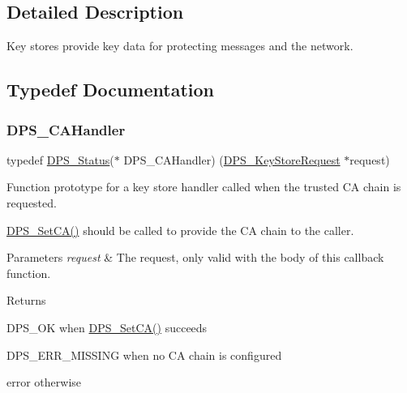 \subsection{Detailed Description}
Key stores provide key data for protecting messages and the network. 



\subsection{Typedef Documentation}
\mbox{\label{group__keystore_ga0acd005f34bca4fcbe1c460e2305ddae}} 
\subsubsection{\texorpdfstring{D\+P\+S\+\_\+\+C\+A\+Handler}{DPS\_CAHandler}}
{\footnotesize\ttfamily typedef \hyperlink{group__status_ga30395a84d3cad9d4ec29848106415038}{D\+P\+S\+\_\+\+Status}($\ast$ D\+P\+S\+\_\+\+C\+A\+Handler) (\hyperlink{group__keystore_ga7c3e50965b65334e9791780fa855ed16}{D\+P\+S\+\_\+\+Key\+Store\+Request} $\ast$request)}



Function prototype for a key store handler called when the trusted CA chain is requested. 

\hyperlink{group__keystore_ga37595f3207e42c52f7006659399135b2}{D\+P\+S\+\_\+\+Set\+C\+A()} should be called to provide the CA chain to the caller.


\begin{DoxyParams}{Parameters}
{\em request} & The request, only valid with the body of this callback function.\\
\hline
\end{DoxyParams}
\begin{DoxyReturn}{Returns}

\begin{DoxyItemize}
\item D\+P\+S\+\_\+\+OK when \hyperlink{group__keystore_ga37595f3207e42c52f7006659399135b2}{D\+P\+S\+\_\+\+Set\+C\+A()} succeeds
\item D\+P\+S\+\_\+\+E\+R\+R\+\_\+\+M\+I\+S\+S\+I\+NG when no CA chain is configured
\item error otherwise 
\end{DoxyItemize}
\end{DoxyReturn}
\mbox{\label{group__keystore_ga5b4cf102912eea802196d3e307c399ef}} 
